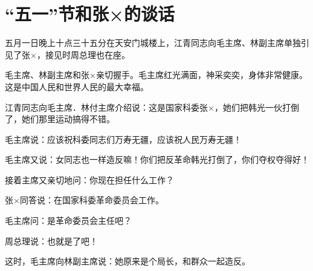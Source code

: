 \section[ “五一”节和张×的谈话（一九六七年五月一日）]{ “五一”节和张×的谈话}


五月一日晚上十点三十五分在天安门城楼上，江青同志向毛主席、林副主席单独引见了张×，接见时周总理也在座。

毛主席、林副主席和张×亲切握手。毛主席红光满面，神采奕奕，身体非常健康。这是中国人民和世界人民的最大幸福。

江青同志向毛主席．林付主席介绍说：这是国家科委张×，她们把韩光一伙打倒了，她们那里运动搞得不错。

毛主席说：应该祝科委同志们万寿无疆，应该祝人民万寿无疆！

毛主席又说：女同志也一样造反嘛！你们把反革命韩光打倒了，你们夺权夺得好！

接着主席又亲切地问：你现在担任什么工作？

张×同答说：在国家科委革命委员会工作。

毛主席问：是革命委员会主任吧？

周总理说：也就是了吧！

这时，毛主席向林副主席说：她原来是个局长，和群众一起造反。

